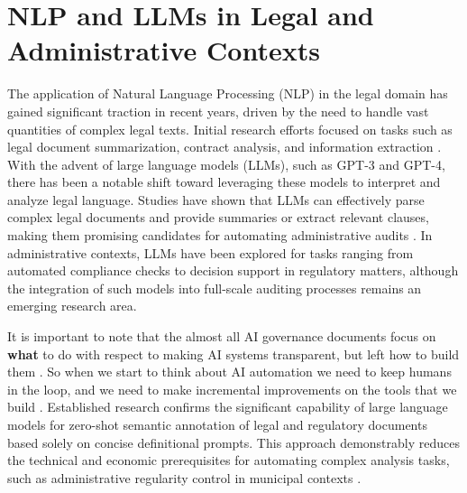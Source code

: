 \documentclass[../main.tex]{subfiles}
\begin{document}
\section{NLP and LLMs in Legal and Administrative Contexts}
The application of Natural Language Processing (NLP) in the legal domain has gained significant traction in recent years, driven by the need to handle vast quantities of complex legal texts. Initial research efforts focused on tasks such as legal document summarization, contract analysis, and information extraction \cite{katzNaturalLanguageProcessing2023}. With the advent of large language models (LLMs), such as GPT-3 and GPT-4, there has been a notable shift toward leveraging these models to interpret and analyze legal language. Studies have shown that LLMs can effectively parse complex legal documents and provide summaries or extract relevant clauses, making them promising candidates for automating administrative audits \cite{ariaiNaturalLanguageProcessing2025}. In administrative contexts, LLMs have been explored for tasks ranging from automated compliance checks to decision support in regulatory matters, although the integration of such models into full-scale auditing processes remains an emerging research area. 

It is important to note that the almost all AI governance documents focus on \textbf{what} to do with respect to making AI systems transparent, but left how to build them \cite{bellThinkStakeholdersFirst2022}. So when we start to think about AI automation we need to keep humans in the loop, and we need to make incremental improvements on the tools that we build \cite{ibrahimStaticAIEvaluations2024}. Established research confirms the significant capability of large language models for zero-shot semantic annotation of legal and regulatory documents based solely on concise definitional prompts. This approach demonstrably reduces the technical and economic prerequisites for automating complex analysis tasks, such as administrative regularity control in municipal contexts \cite{savelkaUnreasonableEffectivenessLarge2023}.
\end{document}
